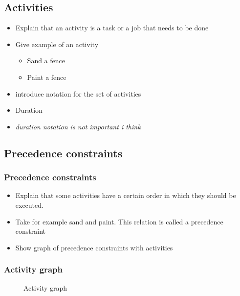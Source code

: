 \documentclass{beamer}
\theoremstyle{definition}
\newcommand{\inputtikz}[1]{}
\newcommand{\mick}[1]{{\color{red}\emph{#1}}}
\begin{document}
\subsection{Activities}
\begin{frame}
	\begin{itemize}
		\item Explain that an activity is a task or a job that needs to be done
		\item Give example of an activity
		\begin{itemize}
			\item Sand a fence
			\item Paint a fence
		\end{itemize}
		\item introduce notation for the set of activities
		\item Duration
		\item \mick{duration notation is not important i think}
	\end{itemize}
\end{frame}

\subsection{Precedence constraints}
\begin{frame}
	\frametitle{Precedence constraints}
	\begin{itemize}
		\item Explain that some activities have a certain order in which they should be executed. 
		\item Take for example sand and paint. This relation is called a precedence constraint
		\item Show graph of precedence constraints with activities
	\end{itemize}
\end{frame}

\begin{frame}
	\frametitle{Activity graph}
	\vspace{-1em}
	\begin{figure}[ht]
		\makebox[\textwidth][c]{\resizebox{.8\paperwidth}{!}{
			\inputtikz{activity_graph}
		}}
		\vspace{-1em}
		\caption{Activity graph}
		\label{fig:activity_graph}
	\end{figure}
\end{frame}
\end{document}
